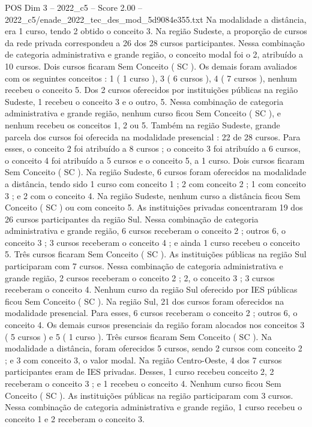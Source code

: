 \begin{textsample}{POS Dim 3 – 2022\_c5 – Score 2.00 – 2022\_c5/enade\_2022\_tec\_des\_mod\_5d9084e355.txt}
Na modalidade a distância, era 1 curso, tendo 2 obtido o conceito 3.
Na região Sudeste, a proporção de cursos da rede privada correspondeu a 26 dos 28 cursos participantes.
Nessa combinação de categoria administrativa e grande região, o conceito modal foi o 2, atribuído a 10 cursos.
Dois cursos ficaram Sem Conceito ( SC ).
Os demais foram avaliados com os seguintes conceitos : 1 ( 1 curso ), 3 ( 6 cursos ), 4 ( 7 cursos ), nenhum recebeu o conceito 5.
Dos 2 cursos oferecidos por instituições públicas na região Sudeste, 1 recebeu o conceito 3 e o outro, 5.
Nessa combinação de categoria administrativa e grande região, nenhum curso ficou Sem Conceito ( SC ), e nenhum recebeu os conceitos 1, 2 ou 5.
Também na região Sudeste, grande parcela dos cursos foi oferecida na modalidade presencial : 22 de 28 cursos.
Para esses, o conceito 2 foi atribuído a 8 cursos ; o conceito 3 foi atribuído a 6 cursos, o conceito 4 foi atribuído a 5 cursos e o conceito 5, a 1 curso.
Dois cursos ficaram Sem Conceito ( SC ).
Na região Sudeste, 6 cursos foram oferecidos na modalidade a distância, tendo sido 1 curso com conceito 1 ; 2 com conceito 2 ; 1 com conceito 3 ; e 2 com o conceito 4.
Na região Sudeste, nenhum curso a distância ficou Sem Conceito ( SC ) ou com conceito 5.
As instituições privadas concentraram 19 dos 26 cursos participantes da região Sul.
Nessa combinação de categoria administrativa e grande região, 6 cursos receberam o conceito 2 ; outros 6, o conceito 3 ; 3 cursos receberam o conceito 4 ; e ainda 1 curso recebeu o conceito 5.
Três cursos ficaram Sem Conceito ( SC ).
As instituições públicas na região Sul participaram com 7 cursos.
Nessa combinação de categoria administrativa e grande região, 2 cursos receberam o conceito 2 ; 2, o conceito 3 ; 3 cursos receberam o conceito 4.
Nenhum curso da região Sul oferecido por IES públicas ficou Sem Conceito ( SC ).
Na região Sul, 21 dos cursos foram oferecidos na modalidade presencial.
Para esses, 6 cursos receberam o conceito 2 ; outros 6, o conceito 4.
Os demais cursos presenciais da região foram alocados nos conceitos 3 ( 5 cursos ) e 5 ( 1 curso ).
Três cursos ficaram Sem Conceito ( SC ).
Na modalidade a distância, foram oferecidos 5 cursos, sendo 2 cursos com conceito 2 ; e 3 com conceito 3, o valor modal.
Na região Centro-Oeste, 4 dos 7 cursos participantes eram de IES privadas.
Desses, 1 curso recebeu conceito 2, 2 receberam o conceito 3 ; e 1 recebeu o conceito 4.
Nenhum curso ficou Sem Conceito ( SC ).
As instituições públicas na região participaram com 3 cursos.
Nessa combinação de categoria administrativa e grande região, 1 curso recebeu o conceito 1 e 2 receberam o conceito 3.

\end{textsample}
